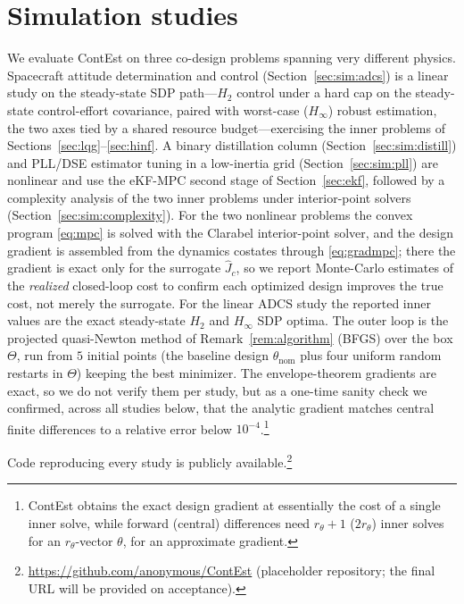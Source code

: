 \documentclass[twocolumn,amsthm]{autart}
\begin{document}
\section{Simulation studies}\label{sec:numerical}

We evaluate ContEst on three co-design problems spanning very different physics.
Spacecraft attitude determination and control (Section~\ref{sec:sim:adcs}) is a
linear study on the steady-state SDP path---$H_2$ control under a hard cap on the
steady-state control-effort covariance, paired with worst-case ($H_\infty$) robust
estimation, the two axes tied by a shared resource budget---exercising the inner
problems of Sections~\ref{sec:lqg}--\ref{sec:hinf}. A binary distillation column
(Section~\ref{sec:sim:distill}) and PLL/DSE estimator tuning in a low-inertia grid
(Section~\ref{sec:sim:pll}) are nonlinear and use the eKF-MPC second stage of
Section~\ref{sec:ekf}, followed by a complexity analysis of the two inner problems
under interior-point solvers (Section~\ref{sec:sim:complexity}). For the two
nonlinear problems the convex program \eqref{eq:mpc} is solved with the Clarabel
interior-point solver, and the design gradient is assembled from the dynamics
costates through \eqref{eq:gradmpc}; there the gradient is exact only for the
surrogate $\widehat J_c$, so we report Monte-Carlo estimates of the \emph{realized}
closed-loop cost to confirm each optimized design improves the true cost, not
merely the surrogate. For the linear ADCS study the reported inner values are the
exact steady-state $H_2$ and $H_\infty$ SDP optima.
The outer loop is the projected quasi-Newton method of
Remark~\ref{rem:algorithm} (BFGS) over the box $\Theta$, run from $5$ initial
points (the baseline design $\theta_{\mathrm{nom}}$ plus four uniform random
restarts in $\Theta$) keeping the best minimizer. The envelope-theorem gradients are exact, so we do not verify them
per study, but as a one-time sanity check we confirmed, across all studies below, that
the analytic gradient matches central finite differences to a relative error below
$10^{-4}$.\footnote{ContEst obtains the exact design gradient at essentially the cost of a
single inner solve, while forward (central) differences need $r_\theta+1$ ($2r_\theta$)
inner solves for an $r_\theta$-vector $\theta$, for an approximate gradient.}

Code
reproducing every study is publicly
available.\footnote{\url{https://github.com/anonymous/ContEst} (placeholder
repository; the final URL will be provided on acceptance).}
\end{document}
